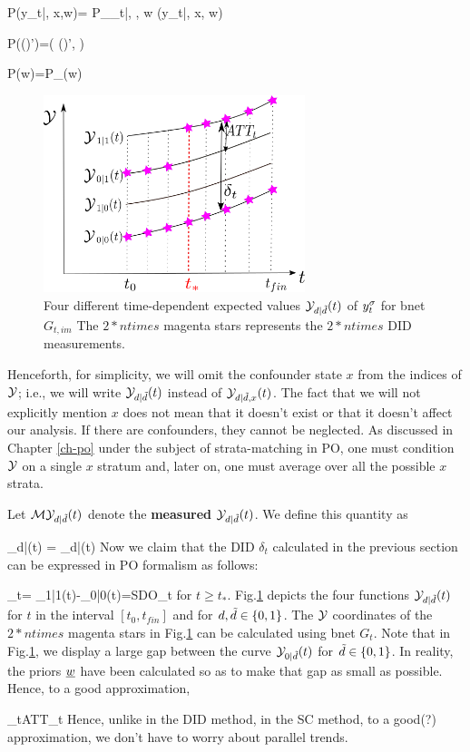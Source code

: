 \beq\color{blue}
P(y_t|\td, x,w)=
P_{\rvy_t|\rvt, \rvx, w}
(y_t|\td, x, w)
\eeq

\beq\color{blue}
P((\td)')=\delta(
(\td)', \td)
\eeq

\beq\color{blue}
P(w)=P_{\rvw}(w)
\eeq

\begin{figure}[h!]
\centering
\includegraphics[width=3in]
{syn-con/syn-con-bc.png}
\caption{Four different time-dependent
expected 
values ${\cal Y}_{d|{\tilde{d}}}(t)$ of $y^\sigma_t$
for bnet $G_{t, im}$
The $2*ntimes$ magenta  stars
represents the $2*ntimes$ DID measurements.} 
\label{fig-syn-con-bc}
\end{figure}

Henceforth, 
for simplicity, we will
omit the confounder state $x$
from the indices of ${\cal Y}$; i.e., we will write
${\cal Y}_{d|{\tilde{d}}}(t)$
instead of ${\cal Y}_{d|{\tilde{d}}, x}(t)$.
The fact that we will
not explicitly
mention $x$ does not
mean that it doesn't exist
or that it doesn't affect our analysis.
If there are confounders,
they cannot be neglected.
As discussed in Chapter \ref{ch-po}
under the subject of strata-matching in PO,
one must condition ${\cal Y}$
on a single $x$ stratum
and, later on,  one must average
over all the possible $x$ strata.


Let ${\cal M}{\cal Y}_{d|{\tilde{d}}}(t)$ denote the
{\bf measured ${\cal Y}_{d|{\tilde{d}}}(t)$}.
We define this quantity as

\beq
\calm\caly_{d|\td}(t)
=
\caly_{d|\td}(t)
\left[ \indi(d=0, t< t_*)+
\indi(d=\td, t> t_*)\right]
\eeq
Now we claim that the DID 
$\delta_t$ calculated in the 
previous section 
can be expressed in PO formalism as follows:

\beqa
\delta_t=
\caly_{1|1}(t)-\caly_{0|0}(t)=SDO_t
\;
\eeqa
for $t\geq t_*$.
Fig.\ref{fig-syn-con-bc}
depicts the
four functions
${\cal Y}_{d|{\tilde{d}}}(t)$
for $t$ in the interval  $[t_0, t_{fin}]$
and for $d,{\tilde{d}}\in \{0,1\}$.
The ${\cal Y}$ coordinates
of the $2*ntimes$ magenta stars in 
Fig.\ref{fig-syn-con-bc} can 
be calculated using bnet $G_t$.
Note that in Fig.\ref{fig-syn-con-bc},
we display a large gap
between the curve ${\cal Y}_{0|{\tilde{d}}}(t)$
for ${\tilde{d}}\in \{0,1\}$.
In reality, the priors
${\underline{w}}$ have been
calculated so as to make that
gap as small as possible.
Hence, to a good approximation,

\beq
\delta_t\approx ATT_t
\eeq
Hence, unlike in the DID method,
in the SC method, to a good(?)
approximation, we don't have to worry
about parallel trends.